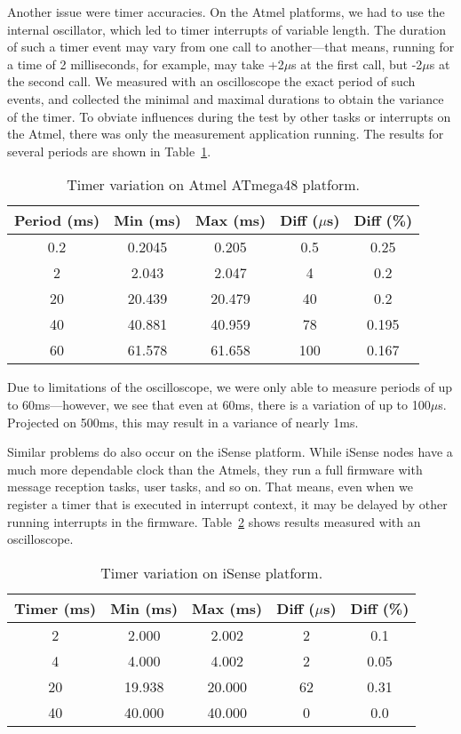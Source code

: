 Another issue were timer accuracies. On the Atmel platforms, we had to
use the internal oscillator, which led to timer interrupts of variable
length. The duration of such a timer event may vary from one call to
another---that means, running for a time of 2 milliseconds, for
example, may take +2$\mu$s at the first call, but -2$\mu$s at the
second call. We measured with an oscilloscope the exact period of such
events, and collected the minimal and maximal durations to obtain the
variance of the timer. To obviate influences during the test by other
tasks or interrupts on the Atmel, there was only the measurement
application running. The results for several periods are shown in
Table~\ref{sec:exp:atmel_clock}.

\begin{table}
  \caption{Timer variation on Atmel ATmega48 platform.}
  \center
  \begin{tabular}{ |c|c c c c| }
    \hline
    Period (ms) & Min (ms) & Max (ms) & Diff ($\mu$s) & Diff (\%) \\
    \hline
    0.2 &  0.2045 &  0.205 & 0.5 & 0.25 \\
    2   &  2.043  &  2.047 & 4   & 0.2 \\
    20  & 20.439  & 20.479 & 40  & 0.2 \\
    40  & 40.881  & 40.959 & 78  & 0.195 \\
    60  & 61.578  & 61.658 & 100 & 0.167 \\
    \hline
  \end{tabular}
  \label{sec:exp:atmel_clock}
\end{table}

Due to limitations of the oscilloscope, we were only able to measure
periods of up to 60ms---however, we see that even at 60ms, there is a
variation of up to 100$\mu$s. Projected on 500ms, this may result in a
variance of nearly 1ms.

Similar problems do also occur on the iSense platform. While iSense
nodes have a much more dependable clock than the Atmels, they run a
full firmware with message reception tasks, user tasks, and so
on. That means, even when we register a timer that is executed in
interrupt context, it may be delayed by other running interrupts in
the firmware. Table~\ref{sec:exp:isense_timer} shows results
measured with an oscilloscope.

\begin{table}
  \caption{Timer variation on iSense platform.}
  \center
  \begin{tabular}{ |c|c c c c| }
    \hline
    Timer (ms) & Min (ms) & Max (ms) & Diff ($\mu$s) & Diff (\%) \\
    \hline
    2  &  2.000 &  2.002 &  2 & 0.1  \\
    4  &  4.000 &  4.002 &  2 & 0.05 \\
    20 & 19.938 & 20.000 & 62 & 0.31 \\
    40 & 40.000 & 40.000 &  0 & 0.0  \\
    \hline
  \end{tabular}
  \label{sec:exp:isense_timer}
\end{table}

